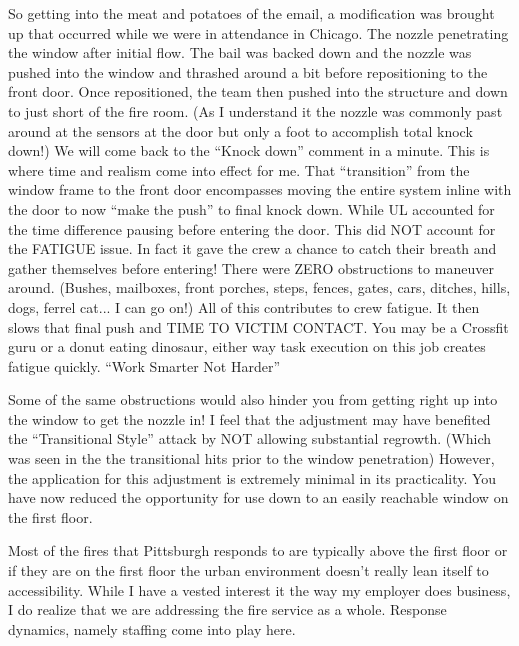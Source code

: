\documentclass[12pt,oneside]{book}
\begin{document}
\begin{appendix}
So getting into the meat and potatoes of the email, a modification was brought up that occurred while we were in attendance in Chicago.  The nozzle penetrating the window after initial flow.  The bail was backed down and the nozzle was pushed into the window and thrashed around a bit before repositioning to the front door.  Once repositioned, the team then pushed into the structure and down to just short of the fire room. (As I understand it the nozzle was commonly past around at the sensors at the door but only a foot to accomplish total knock down!)  We will come back to the ``Knock down'' comment in a minute.  This is where time and realism come into effect for me.  That ``transition'' from the window frame to the front door encompasses moving the entire system inline with the door to now ``make the push'' to final knock down. While UL accounted for the time difference pausing before entering the door.  This did NOT account for the FATIGUE issue.  In fact it gave the crew a chance to catch their breath and gather themselves before entering!  There were ZERO obstructions to maneuver around.  (Bushes, mailboxes, front porches, steps, fences, gates, cars, ditches, hills, dogs, ferrel cat...  I can go on!)  All of this contributes to crew fatigue.  It then slows that final push and TIME TO VICTIM CONTACT.  You may be a Crossfit guru or a donut eating dinosaur, either way task execution on this job creates fatigue quickly.  ``Work Smarter Not Harder''
 
Some of the same obstructions would also hinder you from getting right up into the window to get the nozzle in!  I feel that the adjustment may have benefited the ``Transitional Style'' attack by NOT allowing substantial regrowth. (Which was seen in the the transitional hits prior to the window penetration) However, the application for this adjustment is extremely minimal in its practicality.  You have now reduced the opportunity for use down to an easily reachable window on the first floor.  
 
Most of the fires that Pittsburgh responds to are typically above the first floor or if they are on the first floor the urban environment doesn't really lean itself to accessibility.  While I have a vested interest it the way my employer does business, I do realize that we are addressing the fire service as a whole.  Response dynamics, namely staffing come into play here.  
 

\end{appendix}
\end{document}
